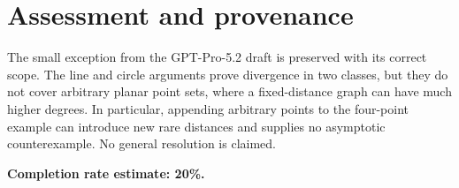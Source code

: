 \documentclass[11pt]{article}
\begin{document}
\section*{Assessment and provenance}
The small exception from the GPT-Pro-5.2 draft is preserved with its correct scope. The line and circle arguments prove divergence in two classes, but they do not cover arbitrary planar point sets, where a fixed-distance graph can have much higher degrees. In particular, appending arbitrary points to the four-point example can introduce new rare distances and supplies no asymptotic counterexample. No general resolution is claimed.

\textbf{Completion rate estimate: 20\%.}
\end{document}
